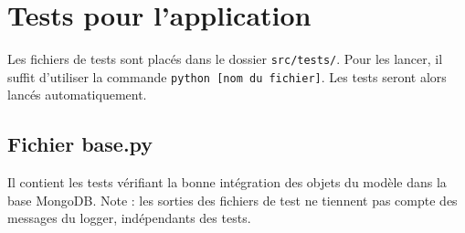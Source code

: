 \section{Tests pour l'application}

Les fichiers de tests sont placés dans le dossier \texttt{src/tests/}. Pour les lancer, il suffit d'utiliser la commande \texttt{python [nom du fichier]}. Les tests seront alors lancés automatiquement.

\subsection{Fichier base.py}

Il contient les tests vérifiant la bonne intégration des objets du modèle dans la base MongoDB. Note : les sorties des fichiers de test ne tiennent pas compte des messages du logger, indépendants des tests.

